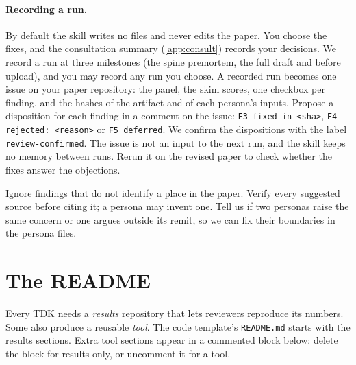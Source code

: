 \paragraph{Recording a run.} By default the skill writes no files and never edits the paper. You choose the fixes, and the consultation summary (\cref{app:consult}) records your decisions. We record a run at three milestones (the spine premortem, the full draft and before upload), and you may record any run you choose. A recorded run becomes one issue on your paper repository: the panel, the skim scores, one checkbox per finding, and the hashes of the artifact and of each persona's inputs. Propose a disposition for each finding in a comment on the issue: \texttt{F3 fixed in <sha>}, \texttt{F4 rejected: <reason>} or \texttt{F5 deferred}. We confirm the dispositions with the label \texttt{review-confirmed}. The issue is not an input to the next run, and the skill keeps no memory between runs. Rerun it on the revised paper to check whether the fixes answer the objections.

Ignore findings that do not identify a place in the paper. Verify every suggested source before citing it; a persona may invent one. Tell us if two personas raise the same concern or one argues outside its remit, so we can fix their boundaries in the persona files.

\section{The README}\label{app:code:readme}
Every TDK needs a \emph{results} repository that lets reviewers reproduce its numbers. Some also produce a reusable \emph{tool}. The code template's \texttt{README.md} starts with the results sections. Extra tool sections appear in a commented block below: delete the block for results only, or uncomment it for a tool.

